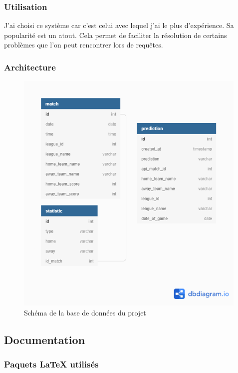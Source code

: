 \documentclass[a4paper,14pt]{extarticle}
\begin{document}
{\subsubsection{Utilisation}
J'ai choisi ce système car c'est celui avec lequel j'ai le plus d'expérience. Sa popularité est un atout. Cela permet de faciliter la résolution de certains problèmes que l'on peut rencontrer lors de requêtes.

\newpage

\subsubsection{Architecture}

\begin{figure}[htp]
    \centering
    \includegraphics[width=30em]{../img/schemaBDD.png}
    \caption{Schéma de la base de données du projet}
    \label{fig:schemaDB}
\end{figure}

\newpage

\subsection{Documentation}

\subsubsection{Paquets \LaTeX{} utilisés}

}
\end{document}
